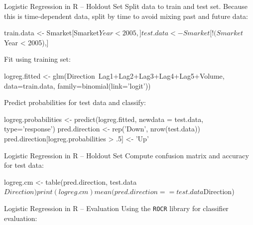 \documentclass[ignorenonframetext,xcolor=x11names]{beamer}
\begin{document}
\begin{frame}[fragile]{Logistic Regression in R -- Holdout Set} 
\small
Split data to train and test set. Because this is time-dependent data, split by time to avoid mixing past and future data:
\begin{Rcode}
train.data <- Smarket[Smarket$Year < 2005,]
test.data <- Smarket[!(Smarket$Year < 2005),]
\end{Rcode}
Fit using training set:
\begin{Rcode}
logreg.fitted <- 
   glm(Direction~Lag1+Lag2+Lag3+Lag4+Lag5+Volume, 
   data=train.data, family=binomial(link='logit'))
\end{Rcode}
Predict probabilities for test data and classify:
\begin{Rcode}
logreg.probabilities <- predict(logreg.fitted, 
    newdata = test.data, type='response')
pred.direction <- rep('Down', nrow(test.data))
pred.direction[logreg.probabilities > .5] <- 'Up'
\end{Rcode}
\end{frame}

\begin{frame}[fragile]{Logistic Regression in R -- Holdout Set} 
\small
Compute confusion matrix and accuracy for test data:
\begin{Rcode}
logreg.cm <- table(pred.direction, test.data$Direction)
print(logreg.cm)
mean(pred.direction == test.data$Direction)
\end{Rcode}
\end{frame}

\begin{frame}[fragile]{Logistic Regression in R -- Evaluation}
\small
Using the \texttt{ROCR} library for classifier evaluation:
\end{frame}
\end{document}
